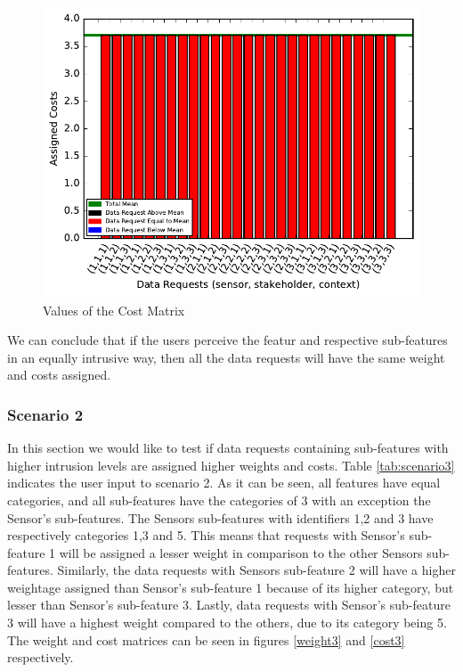 \begin{figure}[ht!]
\centering
\includegraphics[width=\textwidth,keepaspectratio]{./images/cost_1_1}
\caption{Values of the Cost Matrix \label{cost11}}
\end{figure}

We can conclude that if the users perceive the featur and respective sub-features in an equally intrusive way, then all the
data requests will have the same weight and costs assigned.

\subsubsection{Scenario 2}
In this section we would like to test if data requests containing sub-features with higher intrusion levels are assigned higher weights and costs.
Table \ref{tab:scenario3} indicates the user input to scenario 2. As it can be seen, all features have equal categories, and
all sub-features have the categories of 3 with an exception the  Sensor's sub-features. The Sensors sub-features with identifiers 1,2 and 3 have respectively categories 1,3 and 5. This means that requests with Sensor's sub-feature 1 will be assigned a lesser weight in comparison to the other Sensors sub-features. Similarly, the data requests
with Sensors sub-feature 2 will have a higher weightage assigned than Sensor's sub-feature 1 because of its higher category, but lesser than Sensor's sub-feature 3. Lastly, data requests with Sensor's sub-feature 3 will have a highest weight compared to the others, due to its category being 5. The weight and cost matrices can be seen in figures \ref{weight3} and \ref{cost3} respectively.

